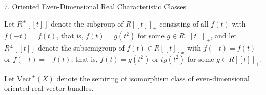7. Oriented Even-Dimensional Real Characteristic Classes

Let $R^+[[t]]$ denote the subgroup of $R[[t]]_+$ consisting of all $f(t)$ with $f(-t) = f(t)$, that is, $f(t) = g(t^2)$ for some $g \in R[[t]]_+$, and let $R^\pm[[t]]$ denote the subsemigroup of $f(t) \in R[[t]]_x$ with $f(-t) = f(t)$ or $f(-t) = -f(t)$, that is, $f(t) = g(t^2)$ or $tg(t^2)$ for some $g \in R[[t]]_+$.

Let $\text{Vect}^+(X)$ denote the semiring of isomorphism class of even-dimensional oriented real vector bundles.
